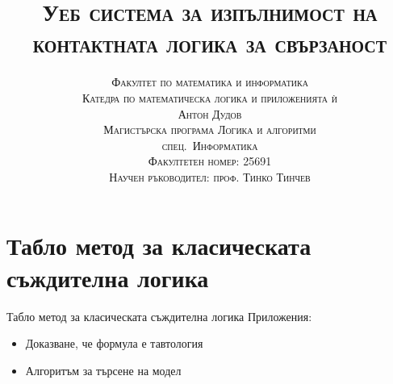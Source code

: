 \documentclass[14pt, aspectratio=169]{beamer}
\date[\today]{}
\title{\textsc{Уеб система за изпълнимост на контактната логика за свързаност}}
\author[Антон Дудов]{
	\textsc{Факултет по математика и информатика} \\
	\textsc{Катедра по математическа логика и приложенията ѝ} \\ [3mm]
	\textsc{Антон Дудов} \\ [3mm]
	\small
	\textsc{Магистърска програма Логика и алгоритми} \\
	\textsc{спец.~Информатика} \\
	\textsc{Факултетен номер: 25691} \\ [3mm]
	\small\textsc{Научен ръководител: проф. Тинко Тинчев}
}
\begin{document}
\begin{frame}
\titlepage
\end{frame}

\begin{frame}
\tableofcontents
\end{frame}

\section{Табло метод за класическата съждителна логика}


\begin{frame}{Табло метод за класическата съждителна логика}
Приложения:
\begin{itemize}
	\item<1-> Доказване, че формула е тавтология

	\item<3-> Алгоритъм за търсене на модел %
\end{itemize}
\end{frame}



\end{document}

